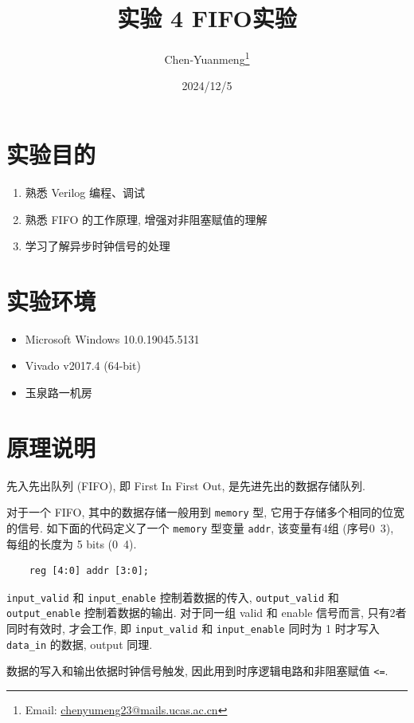 \documentclass{article}
\title{实验 4 \quad FIFO实验}
\author{Chen-Yuanmeng\thanks{Email: \url{chenyumeng23@mails.ucas.ac.cn}}}
\date{2024/12/5}
\providecommand{\tightlist}{\setlength{\itemsep}{0pt}\setlength{\parskip}{0pt}}
\begin{document}
\maketitle

\section{实验目的}

\begin{enumerate}\tightlist
    \item 熟悉 Verilog 编程、调试
    \item 熟悉 FIFO 的工作原理, 增强对非阻塞赋值的理解
    \item 学习了解异步时钟信号的处理
\end{enumerate}

\section{实验环境}

\begin{itemize}\tightlist
    \item Microsoft Windows 10.0.19045.5131
    \item Vivado v2017.4 (64-bit)
    \item 玉泉路一机房
\end{itemize}

\section{原理说明}

先入先出队列 (FIFO), 即 First In First Out, 是先进先出的数据存储队列.

对于一个 FIFO, 其中的数据存储一般用到 \lstinline|memory| 型, 它用于存储多个相同的位宽的信号. 如下面的代码定义了一个 \lstinline|memory| 型变量 \lstinline|addr|, 该变量有4组 (序号0~3), 每组的长度为 5 bits (0~4).

\begin{lstlisting}
    reg [4:0] addr [3:0];
\end{lstlisting}

\lstinline|input_valid| 和 \lstinline|input_enable| 控制着数据的传入, \lstinline|output_valid| 和 \lstinline|output_enable| 控制着数据的输出. 对于同一组 valid 和 enable 信号而言, 只有2者同时有效时, 才会工作, 即 \lstinline|input_valid| 和 \lstinline|input_enable| 同时为 1 时才写入 \lstinline|data_in| 的数据, output 同理.

数据的写入和输出依据时钟信号触发, 因此用到时序逻辑电路和非阻塞赋值 \lstinline|<=|.
\end{document}

